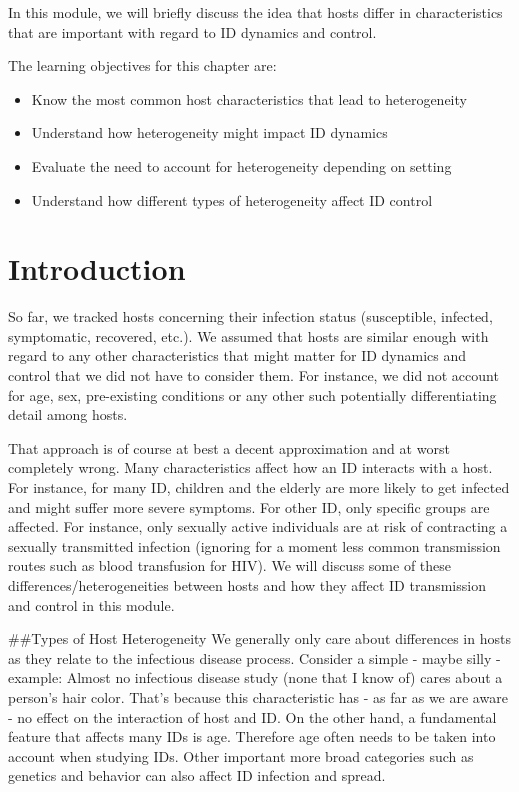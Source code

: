 \documentclass[]{book}
\providecommand{\tightlist}{%
  \setlength{\itemsep}{0pt}\setlength{\parskip}{0pt}}
\theoremstyle{definition}
\theoremstyle{definition}
\theoremstyle{definition}
\theoremstyle{remark}
\begin{document}
In this module, we will briefly discuss the idea that hosts differ in
characteristics that are important with regard to ID dynamics and
control.

The learning objectives for this chapter are:

\begin{itemize}
\tightlist
\item
  Know the most common host characteristics that lead to heterogeneity
\item
  Understand how heterogeneity might impact ID dynamics
\item
  Evaluate the need to account for heterogeneity depending on setting
\item
  Understand how different types of heterogeneity affect ID control
\end{itemize}

\hypertarget{introduction-6}{%
\section{Introduction}\label{introduction-6}}

So far, we tracked hosts concerning their infection status (susceptible,
infected, symptomatic, recovered, etc.). We assumed that hosts are
similar enough with regard to any other characteristics that might
matter for ID dynamics and control that we did not have to consider
them. For instance, we did not account for age, sex, pre-existing
conditions or any other such potentially differentiating detail among
hosts.

That approach is of course at best a decent approximation and at worst
completely wrong. Many characteristics affect how an ID interacts with a
host. For instance, for many ID, children and the elderly are more
likely to get infected and might suffer more severe symptoms. For other
ID, only specific groups are affected. For instance, only sexually
active individuals are at risk of contracting a sexually transmitted
infection (ignoring for a moment less common transmission routes such as
blood transfusion for HIV). We will discuss some of these
differences/heterogeneities between hosts and how they affect ID
transmission and control in this module.

\#\#Types of Host Heterogeneity We generally only care about differences
in hosts as they relate to the infectious disease process. Consider a
simple - maybe silly - example: Almost no infectious disease study (none
that I know of) cares about a person's hair color. That's because this
characteristic has - as far as we are aware - no effect on the
interaction of host and ID. On the other hand, a fundamental feature
that affects many IDs is age. Therefore age often needs to be taken into
account when studying IDs. Other important more broad categories such as
genetics and behavior can also affect ID infection and spread.
\end{document}

